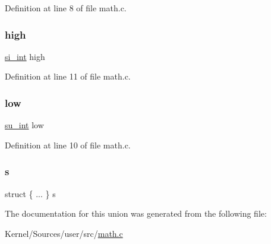 Definition at line 8 of file math.\+c.

\mbox{\label{uniondwords_a293f90287231068768d01783f5e0418e}} 
\subsubsection{\texorpdfstring{high}{high}}
{\footnotesize\ttfamily \hyperlink{math_8c_a631e292730161ad5381eafff0013891e}{si\+\_\+int} high}



Definition at line 11 of file math.\+c.

\mbox{\label{uniondwords_aa8808d04ef26a57c2797d761b736379d}} 
\subsubsection{\texorpdfstring{low}{low}}
{\footnotesize\ttfamily \hyperlink{math_8c_ac80f361c8037aadb06208683492f5753}{su\+\_\+int} low}



Definition at line 10 of file math.\+c.

\mbox{\label{uniondwords_a91b7cb971ea1e9b45f2e55df36121a3e}} 
\subsubsection{\texorpdfstring{s}{s}}
{\footnotesize\ttfamily struct \{ ... \}   s}



The documentation for this union was generated from the following file\+:\begin{DoxyCompactItemize}
\item 
Kernel/\+Sources/user/src/\hyperlink{math_8c}{math.\+c}\end{DoxyCompactItemize}
